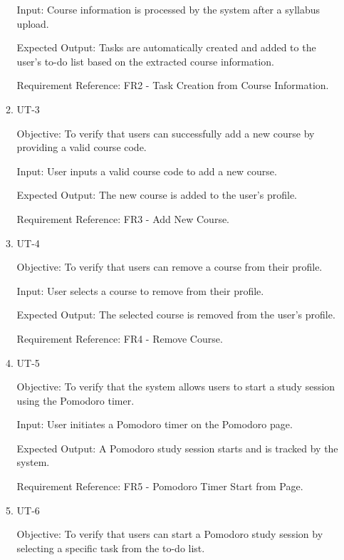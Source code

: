 \documentclass[12pt, titlepage]{article}
\begin{document}
\begin{enumerate}
\begin{enumerate}
        Input: Course information is processed by the system after a syllabus upload.
        
        Expected Output: Tasks are automatically created and added to the user's to-do list based on the extracted course information.
        
        Requirement Reference: FR2 - Task Creation from Course Information.
        
    \item{UT-3\\}\label{UT-3}
    
        Objective: To verify that users can successfully add a new course by providing a valid course code.
        
        Input: User inputs a valid course code to add a new course.
        
        Expected Output: The new course is added to the user's profile.
        
        Requirement Reference: FR3 - Add New Course.
        
    \item{UT-4\\}\label{UT-4}
    
        Objective: To verify that users can remove a course from their profile.
        
        Input: User selects a course to remove from their profile.
        
        Expected Output: The selected course is removed from the user's profile.
        
        Requirement Reference: FR4 - Remove Course.
        
    \item{UT-5\\}\label{UT-5}
    
        Objective: To verify that the system allows users to start a study session using the Pomodoro timer.
        
        Input: User initiates a Pomodoro timer on the Pomodoro page.
        
        Expected Output: A Pomodoro study session starts and is tracked by the system.
        
        Requirement Reference: FR5 - Pomodoro Timer Start from Page.
        
    \item{UT-6\\}\label{UT-6}
    
        Objective: To verify that users can start a Pomodoro study session by selecting a specific task from the to-do list.
        

\end{enumerate}
\end{enumerate}
\end{document}
